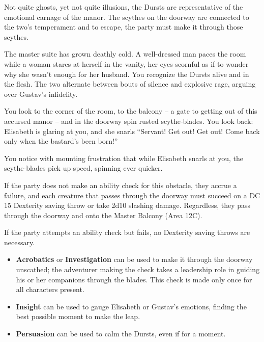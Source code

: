 Not quite ghosts, yet not quite illusions, the Dursts are representative of the emotional carnage of the manor.
The scythes on the doorway are connected to the two's temperament and to escape, the party must make it through
those scythes.
\begin{readout}
  The master suite has grown deathly cold. A well-dressed man paces the room while a woman stares at herself in
  the vanity, her eyes scornful as if to wonder why she wasn't enough for her husband. You recognize the Dursts
  alive and in the flesh. The two alternate between bouts of silence and explosive rage, arguing over Gustav's
  infidelity.
  
  You look to the corner of the room, to the balcony -- a gate to getting out of this accursed manor -- and in
  the doorway spin rusted scythe-blades. You look back: Elisabeth is glaring at you, and she snarls ``Servant!
  Get out! Get out! Come back only when the bastard's been born!''
  
  You notice with mounting frustration that while Elisabeth snarls at you, the scythe-blades pick up speed,
  spinning ever quicker.
\end{readout}
If the party does not make an ability check for this obstacle, they accrue a failure, and each creature that
passes through the doorway must succeed on a DC 15 Dexterity saving throw or take 2d10 slashing damage. 
Regardless, they pass through the doorway and onto the Master Balcony (Area 12C).

If the party attempts an ability check but fails, no Dexterity saving throws are necessary.
\begin{skillChallenge}
  \begin{itemize}
    \item \textbf{Acrobatics} or \textbf{Investigation} can be used to make it through the doorway unscathed;
    the adventurer making the check takes a leadership role in guiding his or her companions through the blades.
    This check is made only once for all characters present. \moderateDC
    \item \textbf{Insight} can be used to gauge Elisabeth or Gustav's emotions, finding the best possible moment 
    to make the leap. \easyDC
    \item \textbf{Persuasion} can be used to calm the Dursts, even if for a moment. \moderateDC
  \end{itemize}
\end{skillChallenge}

